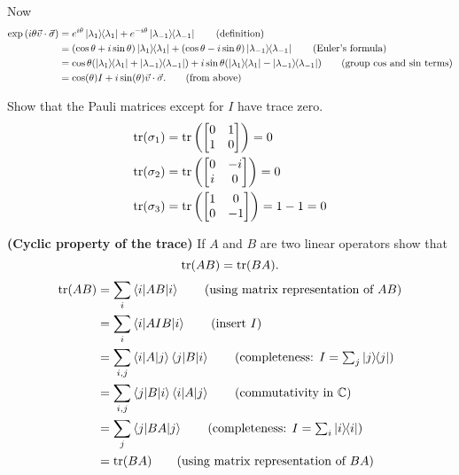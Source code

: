Now
\begin{align*}
	\exp \left(i \theta \vec{v} \cdot \vec{\sigma} \right) &=
	e^{i \theta} \kb{\lambda_1}  + e^{-i \theta} \kb{\lambda_{-1}} \tag{definition}\\
	&= (\cos \theta + i \sin \theta) \kb{\lambda_1} + (\cos \theta - i \sin \theta) \kb{\lambda_{-1}} \tag{Euler's formula}\\
	&= \cos \theta (\kb{\lambda_1} + \kb{\lambda_{-1}}) + i \sin \theta (\kb{\lambda_1} - \kb{\lambda_{-1}}) \tag{group $\cos$ and $\sin$ terms}\\
	&= \cos( \theta) I + i \sin (\theta) \vec{v} \cdot \vec{\sigma}. \tag{from above}
\end{align*}

 Show that the Pauli matrices except for $I$ have trace zero.
\Soln
\begin{align*}
	\Tr (\sigma_1) &= \Tr \left(
		\begin{bmatrix}
		0 & 1 \\
		1 & 0
		\end{bmatrix}
	\right) = 0\\
%
	\Tr (\sigma_2) &= \Tr \left(
		\begin{bmatrix}
		0 & -i \\
		i & 0
		\end{bmatrix}
	\right) = 0\\
%
	\Tr (\sigma_3) &= \Tr \left(
	\begin{bmatrix}
		1 & 0 \\
		0 & -1
	\end{bmatrix}
	\right) = 1 -1 = 0\\
\end{align*}

 \textbf{(Cyclic property of the trace)} If $A$ and $B$ are two linear operators show that $$\operatorname{tr}(AB)=\operatorname{tr}(BA).$$
\begin{align*}
	\Tr (AB) &= \sum_i \braket{i | AB | i} \tag{using matrix representation of $AB$}\\
		&=\sum_i \braket{i | A I B | i} \tag{insert $I$}\\
		&= \sum_{i,j} \braket{i | A | j}\braket{j | B | i} \tag{completeness: $I=\sum_j\kb{j}$}\\
		&= \sum_{i,j} \braket{j | B | i} \braket{i | A | j} \tag{commutativity in $\mathbb{C}$}\\
		&= \sum_j \braket{j | BA | j} \tag{completeness: $I=\sum_i\kb{i}$}\\
		&= \Tr (BA) \tag{using matrix representation of $BA$}
\end{align*}

